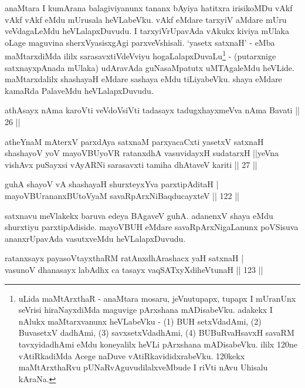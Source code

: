\begin{artha}
anaMtara I kumArana balagiviyanunx tananx bAyiya hatitxra irisikoMDu 
vAkf vAkf vAkf eMdu mUrusala heVLabeVku. vAkf eMdare tarxyiV aMdare 
mUru veVdagaLeMdu heVLalapxDuvudu. I tarxyiVrUpavAda vAkukx kiviya 
mUlaka oLage maguvina sherxVyasisxgAgi parxveVshisali. `yasetx satxnaH' 
- eMba maMtarxdiMda ililx sarasavxtiVdeVviyu 
hogaLalapxDuvaLu\footnote[1]{uLida maMtArxthaR - anaMtara mosaru, 
jeVnutupapx, tupapx I mUranUnx seVrisi hiraNayxdiMda maguvige 
pArxshana mADisabeVku. adakekx I nAlukx maMtarxvanunx heVLabeVku - (1) 
BUH setxVdadAmi, (2) BuvasetxV dadhAmi, (3) savxsetxVdadhAmi, (4) 
BUBuRvaHsavxH savaRM tavxyidadhAmi eMdu koneyalilx heVLi pArxshana 
mADisabeVku. ililx 120ne vAtiRkadiMda Acege naDuve 
vAtiRkavididxrabeVku. 120kekx maMtArxthaRvu pUNaRvAguvudilalxveMbude I 
riVti nAvu Uhisalu kAraNa.} - (putarxnige satxnayxpAnada mUlaka) 
udAravAda guNasaMpatutx uMTAgaleMdu heVLide. maMtarxdalilx shashayaH 
eMdare sashaya eMdu tiLiyabeVku. shaya eMdare kamaRda PalaveMdu 
heVLalapxDuvudu.
\end{artha}

\begin{shl}
athAsayx nAma karoVti veVdoV\s siVti tadasayx tadugxhayxmeVva nAma Bavati || 26 ||
\end{shl}

\begin{shl}
atheYnaM mAterxV parxdAya satxnaM parxyacaCxti yasetxV satxnaH shashayoV yoV mayoVBUyoVR ratanxdhA vasuvidayxH sudatarxH ||yeVna vishAvx puSayxsi vAyARNi sarasavxti tamiha dhAtaveV kariti || 27 ||
\end{shl}

\begin{shl}
guhA shayoV vA shashayaH shurxteyxYva parxtipAditaH | \\
mayoVBUrananxBUtoV\s yaM savaRpArxNiBaqducayxteV \hfill|| 122 || 
\end{shl}

\begin{artha}
satxnavu meVlakekx baruva edeya BAgaveV guhA. adanenxV shaya eMdu 
shurxtiyu parxtipAdiside. mayoVBUH eMdare savaRpArxNigaLanunx 
poVSisuva ananxrUpavAda vasutxveMdu heVLalapxDuvudu.
\end{artha}


\begin{shl}
ratanxsayx payasoV\s tayxthaRM ratAnxdhArashacx yaH satxnaH | \\
vasunoV dhanasayx labAdhx ca tasayx vaqSATxyXdiheVtunaH \hfill|| 123 || 
\end{shl}


